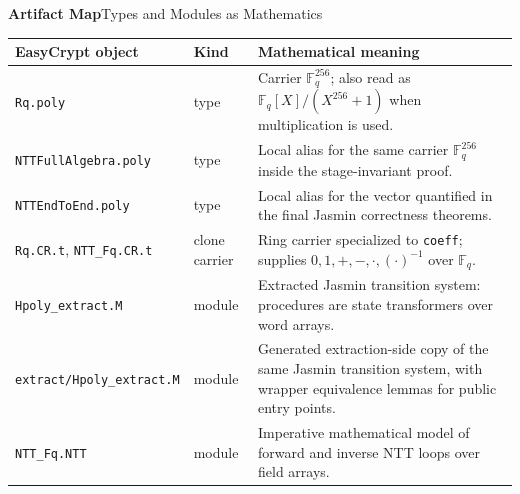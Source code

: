 \documentclass[10pt,aspectratio=1610,compress,dvipsnames]{beamer}
\newcommand{\ec}[1]{\texttt{#1}}
\begin{document}
\begin{frame}{\bfseries Artifact Map}{Types and Modules as Mathematics}
\begin{center}
\tiny\renewcommand{\arraystretch}{1.14}
\setlength{\tabcolsep}{3pt}
\begin{tabular}{p{3.1cm}p{3.3cm}p{5.7cm}}
\toprule[1.2pt]
\textbf{EasyCrypt object} & \textbf{Kind} & \textbf{Mathematical meaning} \\
\midrule
\ec{Rq.poly} & type & Carrier $\mathbb{F}_q^{256}$; also read as
$\mathbb{F}_q[X]/(X^{256}+1)$ when multiplication is used. \\
\ec{NTTFullAlgebra.poly} & type & Local alias for the same carrier
$\mathbb{F}_q^{256}$ inside the stage-invariant proof. \\
\ec{NTTEndToEnd.poly} & type & Local alias for the vector quantified in the
final Jasmin correctness theorems. \\
\ec{Rq.CR.t}, \ec{NTT\_Fq.CR.t} & clone carrier & Ring carrier specialized to
\ec{coeff}; supplies $0,1,+,-,\cdot,(\cdot)^{-1}$ over $\mathbb{F}_q$. \\
\ec{Hpoly\_extract.M} & module & Extracted Jasmin transition system:
procedures are state transformers over word arrays. \\
\ec{extract/Hpoly\_extract.M} & module & Generated extraction-side copy of the
same Jasmin transition system, with wrapper equivalence lemmas for public
entry points. \\
\ec{NTT\_Fq.NTT} & module & Imperative mathematical model of forward and
inverse NTT loops over field arrays. \\
\bottomrule[1.2pt]
\end{tabular}
\end{center}
\end{frame}
\end{document}

